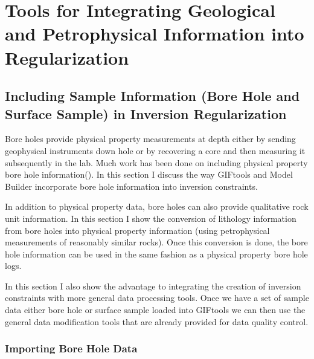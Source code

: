 
\chapter{Tools for Integrating Geological and Petrophysical Information into Regularization}
\label{ch:GIFtools}

\section{Including Sample Information (Bore Hole and Surface Sample) in Inversion Regularization}
\label{sec:BHandSS}

Bore holes provide physical property measurements at depth either by sending geophysical instruments down hole or by recovering a core and then measuring it subsequently in the lab.  Much work has been done on including physical property bore hole information(\cite{williams2008geologically}). In this section I discuss the way GIFtools and Model Builder incorporate bore hole information into inversion constraints.

In addition to physical property data, bore holes can also provide qualitative rock unit information. In this section I show the conversion of lithology information from bore holes into physical property information (using petrophysical measurements of reasonably similar rocks). Once this conversion is done,  the bore hole information can be used in the same fashion as a physical property bore hole logs.

In this section I also show the advantage to integrating the creation of inversion constraints with more general data processing tools. Once we have a set of sample data either bore hole or surface sample loaded into GIFtools we can then use the general data modification tools that are already provided for data quality control.

\subsection{Importing Bore Hole Data}
\label{subsec:importBH}

